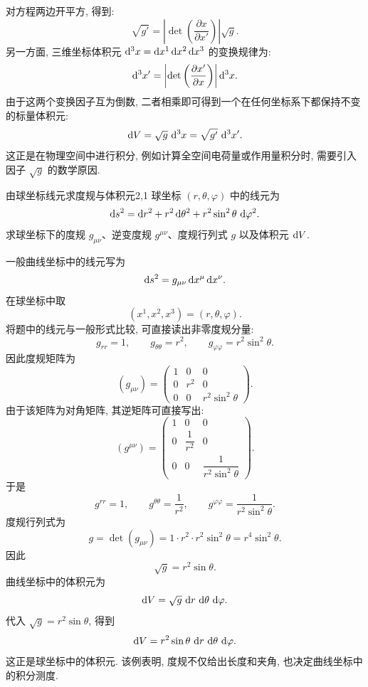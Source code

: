 对方程两边开平方, 得到: 
\[
\sqrt{g'} = \left| \det\left( \frac{\partial x}{\partial x'} \right) \right| \sqrt{g}.
\]
另一方面, 三维坐标体积元 $\mathop{}\!\mathrm{d}^{3}x = \mathop{}\!\mathrm{d} x^{1} \mathop{}\!\mathrm{d} x^{2} \mathop{}\!\mathrm{d} x^{3}$ 的变换规律为: 
\[
\mathop{}\!\mathrm{d}^{3}x' = \left| \det\left( \frac{\partial x'}{\partial x} \right) \right| \mathop{}\!\mathrm{d}^{3}x.
\]
由于这两个变换因子互为倒数, 二者相乘即可得到一个在任何坐标系下都保持不变的标量体积元: 
\[
\mathop{}\!\mathrm{d} V = \sqrt{g}\, \mathop{}\!\mathrm{d}^{3}x = \sqrt{g'}\, \mathop{}\!\mathrm{d}^{3}x'.
\]
这正是在物理空间中进行积分, 例如计算全空间电荷量或作用量积分时, 需要引入因子 $\sqrt{g}$ 的数学原因. 
\begin{example}{由球坐标线元求度规与体积元}{2,1}
	球坐标 $(r,\theta,\varphi)$ 中的线元为
	\[
	\mathop{}\!\mathrm{d} s^{2}
	=
	\mathop{}\!\mathrm{d} r^{2}
	+
	r^{2}\mathop{}\!\mathrm{d}\theta^{2}
	+
	r^{2}\sin^{2}\theta\,\mathop{}\!\mathrm{d}\varphi^{2}.
	\]
	求球坐标下的度规 $g_{\mu\nu}$、逆变度规 $g^{\mu\nu}$、度规行列式 $g$ 以及体积元 $\mathop{}\!\mathrm{d} V$. 
	\begin{solution}
		一般曲线坐标中的线元写为
		\[
		\mathop{}\!\mathrm{d} s^{2}
		=
		g_{\mu\nu}\mathop{}\!\mathrm{d} x^{\mu}\mathop{}\!\mathrm{d} x^{\nu}.
		\]
		在球坐标中取
		\[
		(x^{1},x^{2},x^{3})=(r,\theta,\varphi).
		\]
		将题中的线元与一般形式比较, 可直接读出非零度规分量: 
		\[
		g_{rr}=1,
		\qquad
		g_{\theta\theta}=r^{2},
		\qquad
		g_{\varphi\varphi}=r^{2}\sin^{2}\theta.
		\]
		因此度规矩阵为
		\[
		(g_{\mu\nu})
		=
		\begin{pmatrix}
			1 & 0 & 0\\
			0 & r^{2} & 0\\
			0 & 0 & r^{2}\sin^{2}\theta
		\end{pmatrix}.
		\]
		由于该矩阵为对角矩阵, 其逆矩阵可直接写出: 
		\[
		(g^{\mu\nu})
		=
		\begin{pmatrix}
			1 & 0 & 0\\
			0 & \dfrac{1}{r^{2}} & 0\\
			0 & 0 & \dfrac{1}{r^{2}\sin^{2}\theta}
		\end{pmatrix}.
		\]
		于是
		\[
		g^{rr}=1,
		\qquad
		g^{\theta\theta}=\frac{1}{r^{2}},
		\qquad
		g^{\varphi\varphi}=\frac{1}{r^{2}\sin^{2}\theta}.
		\]
		度规行列式为
		\[
		g
		=
		\det(g_{\mu\nu})
		=
		1\cdot r^{2}\cdot r^{2}\sin^{2}\theta
		=
		r^{4}\sin^{2}\theta.
		\]
		因此
		\[
		\sqrt{g}=r^{2}\sin\theta.
		\]
		曲线坐标中的体积元为
		\[
		\mathop{}\!\mathrm{d} V
		=
		\sqrt{g}\,\mathop{}\!\mathrm{d} r\,\mathop{}\!\mathrm{d}\theta\,\mathop{}\!\mathrm{d}\varphi.
		\]
		代入 $\sqrt{g}=r^{2}\sin\theta$, 得到
		\[
		\mathop{}\!\mathrm{d} V
		=
		r^{2}\sin\theta\,\mathop{}\!\mathrm{d} r\,\mathop{}\!\mathrm{d}\theta\,\mathop{}\!\mathrm{d}\varphi.
		\]
		这正是球坐标中的体积元. 该例表明, 度规不仅给出长度和夹角, 也决定曲线坐标中的积分测度. 
	\end{solution}
\end{example}


